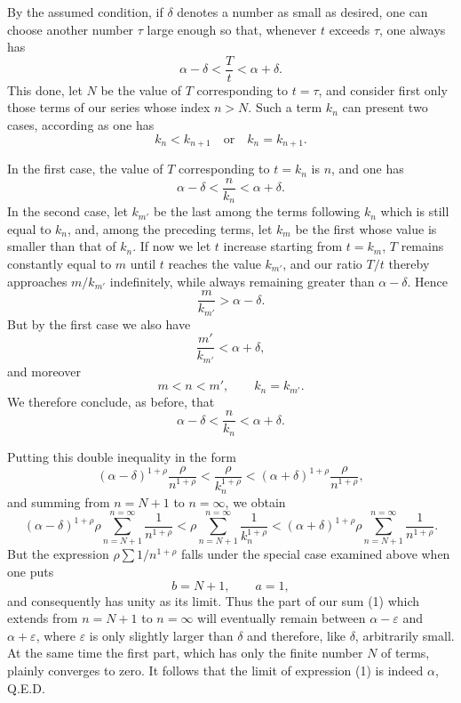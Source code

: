 \documentclass[11pt]{article}
\begin{document}
By the assumed condition, if \(\delta\) denotes a number as small as desired, one can choose another number \(\tau\) large enough so that, whenever \(t\) exceeds \(\tau\), one always has
\[
\alpha-\delta<\frac{T}{t}<\alpha+\delta.
\]
This done, let \(N\) be the value of \(T\) corresponding to \(t=\tau\), and consider first only those terms of our series whose index \(n>N\). Such a term \(k_n\) can present two cases, according as one has
\[
k_n<k_{n+1}\quad\text{or}\quad k_n=k_{n+1}.
\]

In the first case, the value of \(T\) corresponding to \(t=k_n\) is \(n\), and one has
\[
\alpha-\delta<\frac{n}{k_n}<\alpha+\delta.
\]
In the second case, let \(k_{m'}\) be the last among the terms following \(k_n\) which is still equal to \(k_n\), and, among the preceding terms, let \(k_m\) be the first whose value is smaller than that of \(k_n\). If now we let \(t\) increase starting from \(t=k_m\), \(T\) remains constantly equal to \(m\) until \(t\) reaches the value \(k_{m'}\), and our ratio \(T/t\) thereby approaches \(m/k_{m'}\) indefinitely, while always remaining greater than \(\alpha-\delta\). Hence
\[
\frac{m}{k_{m'}}>\alpha-\delta.
\]
But by the first case we also have
\[
\frac{m'}{k_{m'}}<\alpha+\delta,
\]
and moreover
\[
m<n<m',\qquad k_n=k_{m'}.
\]
We therefore conclude, as before, that
\[
\alpha-\delta<\frac{n}{k_n}<\alpha+\delta.
\]

Putting this double inequality in the form
\[
(\alpha-\delta)^{1+\rho}\frac{\rho}{n^{1+\rho}}
<
\frac{\rho}{k_n^{1+\rho}}
<
(\alpha+\delta)^{1+\rho}\frac{\rho}{n^{1+\rho}},
\]
and summing from \(n=N+1\) to \(n=\infty\), we obtain
\[
(\alpha-\delta)^{1+\rho}\rho\sum_{n=N+1}^{n=\infty}\frac{1}{n^{1+\rho}}
<
\rho\sum_{n=N+1}^{n=\infty}\frac{1}{k_n^{1+\rho}}
<
(\alpha+\delta)^{1+\rho}\rho\sum_{n=N+1}^{n=\infty}\frac{1}{n^{1+\rho}}.
\]
But the expression \(\rho\sum 1/n^{1+\rho}\) falls under the special case examined above when one puts
\[
b=N+1,\qquad a=1,
\]
and consequently has unity as its limit. Thus the part of our sum (1) which extends from \(n=N+1\) to \(n=\infty\) will eventually remain between \(\alpha-\varepsilon\) and \(\alpha+\varepsilon\), where \(\varepsilon\) is only slightly larger than \(\delta\) and therefore, like \(\delta\), arbitrarily small. At the same time the first part, which has only the finite number \(N\) of terms, plainly converges to zero. It follows that the limit of expression (1) is indeed \(\alpha\), Q.E.D.
\end{document}
